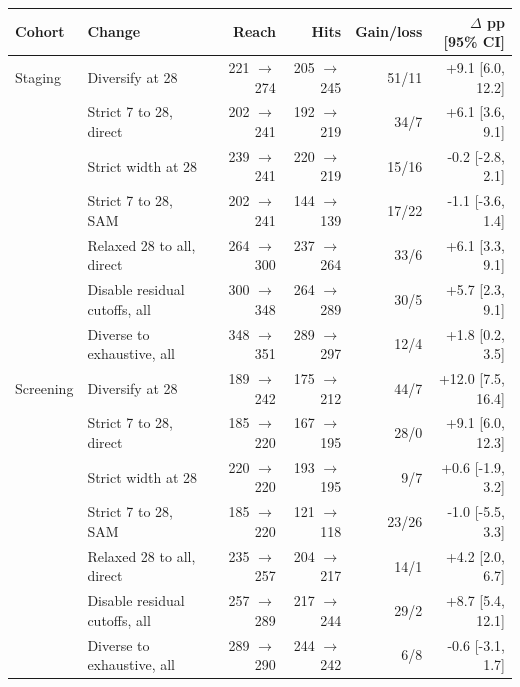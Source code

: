 \begin{tabular}{llrrrr}
\toprule
Cohort & Change & Reach & Hits & Gain/loss & $\Delta$ pp [95\% CI] \\
\midrule
Staging & Diversify at 28 & 221 $\to$ 274 & 205 $\to$ 245 & 51/11 & +9.1 [6.0, 12.2] \\
 & Strict 7 to 28, direct & 202 $\to$ 241 & 192 $\to$ 219 & 34/7 & +6.1 [3.6, 9.1] \\
 & Strict width at 28 & 239 $\to$ 241 & 220 $\to$ 219 & 15/16 & -0.2 [-2.8, 2.1] \\
 & Strict 7 to 28, SAM & 202 $\to$ 241 & 144 $\to$ 139 & 17/22 & -1.1 [-3.6, 1.4] \\
 & Relaxed 28 to all, direct & 264 $\to$ 300 & 237 $\to$ 264 & 33/6 & +6.1 [3.3, 9.1] \\
 & Disable residual cutoffs, all & 300 $\to$ 348 & 264 $\to$ 289 & 30/5 & +5.7 [2.3, 9.1] \\
 & Diverse to exhaustive, all & 348 $\to$ 351 & 289 $\to$ 297 & 12/4 & +1.8 [0.2, 3.5] \\
\midrule
Screening & Diversify at 28 & 189 $\to$ 242 & 175 $\to$ 212 & 44/7 & +12.0 [7.5, 16.4] \\
 & Strict 7 to 28, direct & 185 $\to$ 220 & 167 $\to$ 195 & 28/0 & +9.1 [6.0, 12.3] \\
 & Strict width at 28 & 220 $\to$ 220 & 193 $\to$ 195 & 9/7 & +0.6 [-1.9, 3.2] \\
 & Strict 7 to 28, SAM & 185 $\to$ 220 & 121 $\to$ 118 & 23/26 & -1.0 [-5.5, 3.3] \\
 & Relaxed 28 to all, direct & 235 $\to$ 257 & 204 $\to$ 217 & 14/1 & +4.2 [2.0, 6.7] \\
 & Disable residual cutoffs, all & 257 $\to$ 289 & 217 $\to$ 244 & 29/2 & +8.7 [5.4, 12.1] \\
 & Diverse to exhaustive, all & 289 $\to$ 290 & 244 $\to$ 242 & 6/8 & -0.6 [-3.1, 1.7] \\
\bottomrule
\end{tabular}
